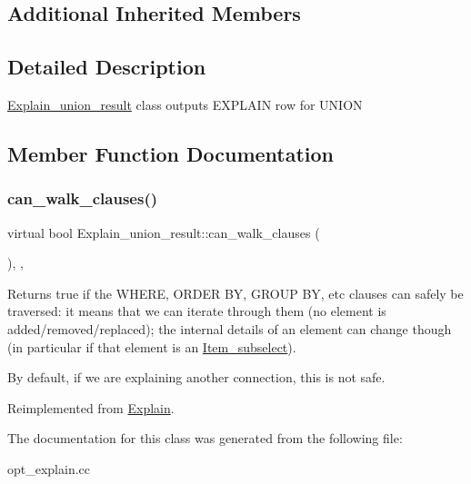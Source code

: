 \subsection*{Additional Inherited Members}


\subsection{Detailed Description}
\mbox{\hyperlink{classExplain__union__result}{Explain\+\_\+union\+\_\+result}} class outputs E\+X\+P\+L\+A\+IN row for U\+N\+I\+ON 

\subsection{Member Function Documentation}
\mbox{\label{classExplain__union__result_a5c825b2170b63e866d0694bb29ee1535}} 
\subsubsection{\texorpdfstring{can\+\_\+walk\+\_\+clauses()}{can\_walk\_clauses()}}
{\footnotesize\ttfamily virtual bool Explain\+\_\+union\+\_\+result\+::can\+\_\+walk\+\_\+clauses (\begin{DoxyParamCaption}{ }\end{DoxyParamCaption})\hspace{0.3cm}{\ttfamily [inline]}, {\ttfamily [protected]}, {\ttfamily [virtual]}}

Returns true if the W\+H\+E\+RE, O\+R\+D\+ER BY, G\+R\+O\+UP BY, etc clauses can safely be traversed\+: it means that we can iterate through them (no element is added/removed/replaced); the internal details of an element can change though (in particular if that element is an \mbox{\hyperlink{classItem__subselect}{Item\+\_\+subselect}}).

By default, if we are explaining another connection, this is not safe. 

Reimplemented from \mbox{\hyperlink{classExplain_a82fdfa033238cfb356903c475ef4a177}{Explain}}.



The documentation for this class was generated from the following file\+:\begin{DoxyCompactItemize}
\item 
opt\+\_\+explain.\+cc\end{DoxyCompactItemize}
